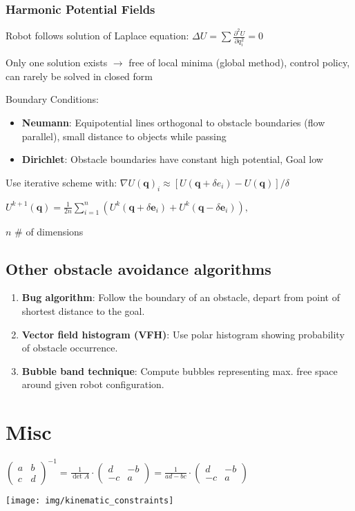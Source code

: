 \documentclass[fontsize=6pt]{scrartcl}
\begin{document}
\begin{multicols*}{4}
\subsubsection*{Harmonic Potential Fields}
Robot follows solution of Laplace equation: $\Delta U = \sum \frac{\partial^2 U}{\partial q_i^2} = 0$

Only one solution exists $\rightarrow$ free of local minima (global method), control policy, can rarely be solved in closed form

Boundary Conditions:
\begin{itemize}
\item \textbf{Neumann}: Equipotential lines orthogonal to obstacle boundaries (flow parallel), small distance to objects while passing
\item \textbf{Dirichlet}: Obstacle boundaries have constant high potential, Goal low
\end{itemize}

Use iterative scheme with:
$
\nabla U(\mathbf q)_i
\approx
[U(\mathbf q + \delta e_i) - U(\mathbf q)]/\delta
$

{\centering
	$
	U^{k+1}(\mathbf q)
	=
	\frac{1}{2n} \sum_{i=1}^n(U^k(\mathbf q + \delta \mathbf e_i)
	+ U^k(\mathbf q - \delta \mathbf e_i)),
	$
\par }

$n$ \# of dimensions

\subsection*{Other obstacle avoidance algorithms}
\begin{enumerate}
	\item \textbf{Bug algorithm}: Follow the boundary of an obstacle, depart from
	point of shortest distance to the goal.
	\item \textbf{Vector field histogram (VFH)}: Use polar histogram showing
	probability of obstacle occurrence.
	\item \textbf{Bubble band technique}: Compute bubbles representing max.
	free space around given robot configuration.
\end{enumerate}

\section*{Misc}

$\begin{pmatrix} a & b \\ c & d \end{pmatrix}^{-1} = \frac{1}{\det A} \cdot \begin{pmatrix} d & -b \\ -c & a \end{pmatrix} = \frac{1}{ad-bc} \cdot \begin{pmatrix} d & -b \\ -c & a \end{pmatrix}$
{\centering 
\texttt{[image: img/kinematic\_constraints]}
\par}


\end{multicols*}
\end{document}
